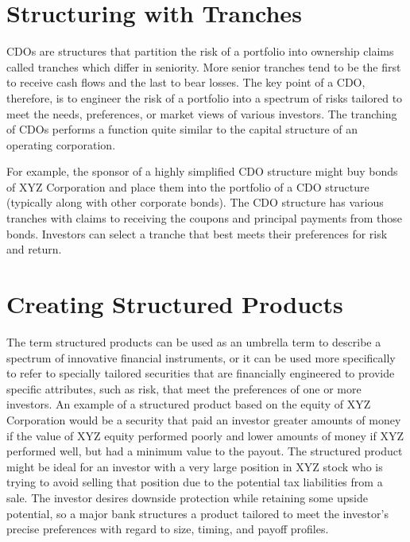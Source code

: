 \documentclass[11pt]{article}
\begin{document}
\section*{Structuring with Tranches}
CDOs are structures that partition the risk of a portfolio into ownership claims called tranches which differ in seniority. More senior tranches tend to be the first to receive cash flows and the last to bear losses. The key point of a CDO, therefore, is to engineer the risk of a portfolio into a spectrum of risks tailored to meet the needs, preferences, or market views of various investors. The tranching of CDOs performs a function quite similar to the capital structure of an operating corporation.

For example, the sponsor of a highly simplified CDO structure might buy bonds of XYZ Corporation and place them into the portfolio of a CDO structure (typically along with other corporate bonds). The CDO structure has various tranches with claims to receiving the coupons and principal payments from those bonds. Investors can select a tranche that best meets their preferences for risk and return.

\section*{Creating Structured Products}
The term structured products can be used as an umbrella term to describe a spectrum of innovative financial instruments, or it can be used more specifically to refer to specially tailored securities that are financially engineered to provide specific attributes, such as risk, that meet the preferences of one or more investors. An example of a structured product based on the equity of XYZ Corporation would be a security that paid an investor greater amounts of money if the value of XYZ equity performed poorly and lower amounts of money if XYZ performed well, but had a minimum value to the payout. The structured product might be ideal for an investor with a very large position in XYZ stock who is trying to avoid selling that position due to the potential tax liabilities from a sale. The investor desires downside protection while retaining some upside potential, so a major bank structures a product tailored to meet the investor's precise preferences with regard to size, timing, and payoff profiles.
\end{document}
